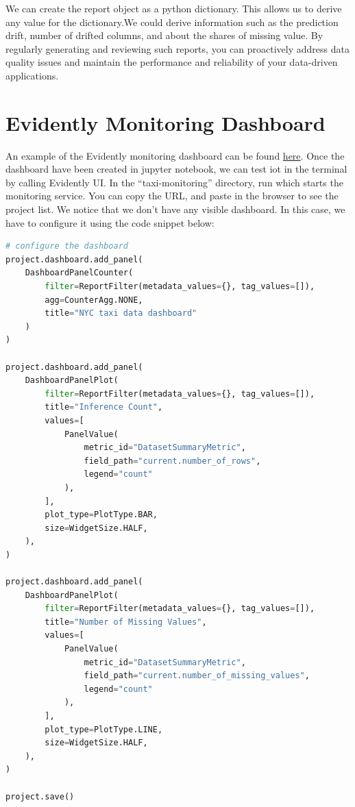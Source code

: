 \documentclass[letterpaper,12pt,notitlepage,twoside]{report}
\begin{document}
We can create the report object as a python dictionary. This allows us to derive any value for the dictionary.We could derive information such as the prediction drift,  number of drifted columns, and about the shares of missing value. By regularly generating and reviewing such reports, you can proactively address data quality issues and maintain the performance and reliability of your data-driven applications.

\section{Evidently Monitoring Dashboard}
An example of the Evidently monitoring dashboard can be found \href{https://github.com/chuksoo/mlops-zoomcamp-2024/blob/main/05%20-%20Monitoring/taxi-monitoring/baseline_model_nyc_taxi_data.ipynb}{here}. Once the dashboard have been created in jupyter notebook, we can test iot in the terminal by calling Evidently UI.  In the ``taxi-monitoring'' directory, run \smtt{evidently ui} which starts the monitoring service. You can copy the URL, and paste in the browser to see the project list.  We notice that we don't have any visible dashboard. In this case, we have to configure it using the code snippet below:

\begin{lstlisting}[language=python, numbers=none]
# configure the dashboard
project.dashboard.add_panel(
    DashboardPanelCounter(
        filter=ReportFilter(metadata_values={}, tag_values=[]),
        agg=CounterAgg.NONE,
        title="NYC taxi data dashboard"
    )
)

project.dashboard.add_panel(
    DashboardPanelPlot(
        filter=ReportFilter(metadata_values={}, tag_values=[]),
        title="Inference Count",
        values=[
            PanelValue(
                metric_id="DatasetSummaryMetric",
                field_path="current.number_of_rows",
                legend="count"
            ),
        ],
        plot_type=PlotType.BAR,
        size=WidgetSize.HALF,
    ),
)

project.dashboard.add_panel(
    DashboardPanelPlot(
        filter=ReportFilter(metadata_values={}, tag_values=[]),
        title="Number of Missing Values",
        values=[
            PanelValue(
                metric_id="DatasetSummaryMetric",
                field_path="current.number_of_missing_values",
                legend="count"
            ),
        ],
        plot_type=PlotType.LINE,
        size=WidgetSize.HALF,
    ),
)

project.save()
\end{lstlisting}
\end{document}
